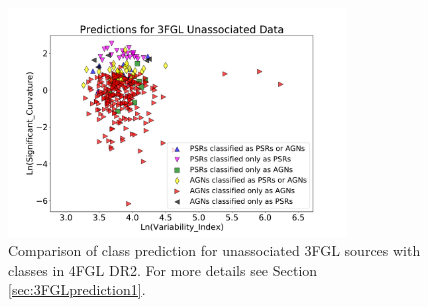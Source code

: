 \begin{table}[!h]
\hspace{-0.2cm}
    \vspace{2mm}
    \caption{Testing accuracy of the 4 selected algorithms for classification of 3FGL sources and comparison with associations in the 4FGL-DR2 catalog. 
    ``\_O'' denotes training with oversampling.}
    \label{tab:selected_algs}
\end{table}



\begin{figure}[h]
\centering
\includegraphics[width=0.8\textwidth]{plots/plot_final_DR2.pdf}
\caption{Comparison of class prediction for unassociated 3FGL sources with classes in 4FGL DR2. 
For more details see Section \ref{sec:3FGLprediction1}.}
\label{fig:3FGL_vs_4FGL_classes}
\end{figure}

